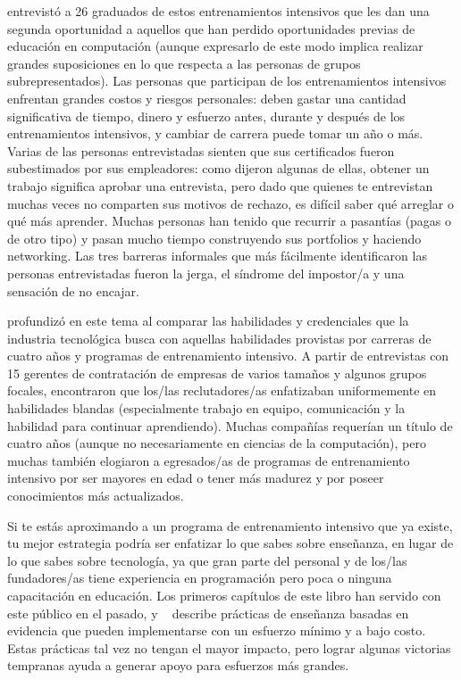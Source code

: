 \cite{Thay2017} entrevistó a 26 graduados de estos entrenamientos intensivos
que les dan una segunda oportunidad a aquellos que han perdido oportunidades previas de educación en computación
(aunque expresarlo de este modo implica realizar grandes suposiciones 
en lo que respecta a las personas de grupos subrepresentados).
Las personas que participan de los entrenamientos intensivos enfrentan grandes costos y riesgos personales:
deben gastar una cantidad significativa de tiempo, dinero y esfuerzo antes, 
durante y después de los entrenamientos intensivos, y cambiar de carrera puede tomar un año o más.
Varias de las personas entrevistadas sienten que sus certificados fueron subestimados por sus empleadores:
como dijeron algunas de ellas,
obtener un trabajo significa aprobar una entrevista,
pero dado que quienes te entrevistan muchas veces no comparten sus motivos de rechazo,
es difícil saber qué arreglar o qué más aprender.
Muchas personas han tenido que recurrir a pasantías (pagas o de otro tipo)
y pasan mucho tiempo construyendo sus portfolios y haciendo networking.
Las tres barreras informales que más fácilmente identificaron las personas entrevistadas fueron la jerga,
el síndrome del impostor/a y una sensación de no encajar.

\cite{Burk2018} profundizó en este tema
al comparar las habilidades y credenciales 
que la industria tecnológica busca con aquellas habilidades provistas por carreras de cuatro años y programas de entrenamiento intensivo.
A partir de entrevistas con 15 gerentes de contratación de empresas de varios tamaños y algunos grupos focales,
encontraron que los/las reclutadores/as enfatizaban uniformemente en habilidades blandas
(especialmente trabajo en equipo, comunicación y la habilidad para continuar aprendiendo).
Muchas compañías requerían un título de cuatro años
(aunque no necesariamente en ciencias de la computación),
pero muchas también elogiaron a egresados/as de programas de entrenamiento intensivo por ser mayores en edad o tener más madurez
y por poseer conocimientos más actualizados.

Si te estás aproximando a un programa de entrenamiento intensivo que ya existe,
tu mejor estrategia podría ser enfatizar lo que sabes sobre enseñanza,
en lugar de lo que sabes sobre tecnología,
ya que gran parte del personal y de los/las fundadores/as tiene experiencia en programación
pero poca o ninguna capacitación en educación.
Los primeros capítulos de este libro han servido con este público en el pasado, 
y ~\cite{Lang2016} describe
prácticas de enseñanza basadas en evidencia que pueden implementarse
con un esfuerzo mínimo y a bajo costo.
Estas prácticas tal vez no tengan el mayor impacto, 
pero lograr algunas victorias tempranas ayuda a generar apoyo para esfuerzos más grandes.

